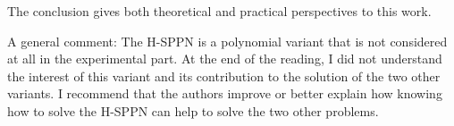 \documentclass{article}
\newenvironment{reviewer}{\setcounter{pointcounter}{1}}{}
\newcommand{\point}{\text{{\selectfont \thepointcounter} \stepcounter{pointcounter}}}
\begin{document}
\begin{reviewer}
		\begin{itshape}
			The conclusion gives both theoretical and practical perspectives to this work.
		\end{itshape}
		
		\begin{tcolorbox}[breakable,enhanced,coltitle=black,colback=green!5!white,colframe=green!75!black,title=\textbf{Answer R2.\point},borderline={1pt}{0pt}{black},boxrule=0pt]
			
		\end{tcolorbox}
		
		\begin{itshape}
			A general comment: The H-SPPN is a polynomial variant that is not considered at all in the experimental part. At the end of the reading, I did not understand the interest of this variant and its contribution to the solution of the two other variants. I recommend that the authors improve or better explain how knowing how to solve the H-SPPN can help to solve the two other problems.
		\end{itshape}
		
		\begin{tcolorbox}[breakable,enhanced,coltitle=black,colback=green!5!white,colframe=green!75!black,title=\textbf{Answer R2.\point},borderline={1pt}{0pt}{black},boxrule=0pt]
			
		\end{tcolorbox}
		
	\end{reviewer}
	
	
\end{document}
